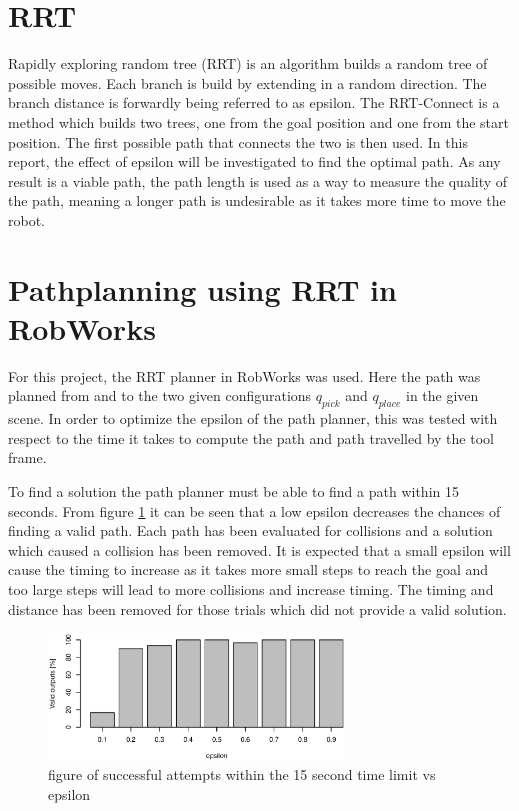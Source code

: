 \documentclass[12pt,a4paper]{article}
\begin{document}
\section{RRT}
Rapidly exploring random tree (RRT) is an algorithm builds a random tree of possible moves.
Each branch is build by extending in a random direction. 
The branch distance is forwardly being referred to as epsilon.
The RRT-Connect is a method which builds two trees, one from the goal position and one from the start position.
The first possible path that connects the two is then used.
In this report, the effect of epsilon will be investigated to find the optimal path.
As any result is a viable path, the path length is used as a way to measure the quality of the path, meaning a longer path is undesirable as it takes more time to move the robot.

\section{Pathplanning using RRT in RobWorks}
For this project, the RRT planner in RobWorks was used.
Here the path was planned from and to the two given configurations $q_{pick}$ and $q_{place}$ in the given scene.
In order to optimize the epsilon of the path planner, this was tested with respect to the time it takes to compute the path and path travelled by the tool frame.

To find a solution the path planner must be able to find a path within 15 seconds.
From figure \ref{fig:successfulVSepsilon} it can be seen that a low epsilon decreases the chances of finding a valid path.
Each path has been evaluated for collisions and a solution which caused a collision has been removed.
It is expected that a small epsilon will cause the timing to increase as it takes more small steps to reach the goal and too large steps will lead to more collisions and increase timing.
The timing and distance has been removed for those trials which did not provide a valid solution.

\begin{figure}[H]
\centering
\includegraphics[width=0.7\textwidth]{../statistics/successfulVSepsilon}
\caption{figure of successful attempts within the 15 second time limit vs epsilon}
\label{fig:successfulVSepsilon}
\end{figure}
\end{document}
